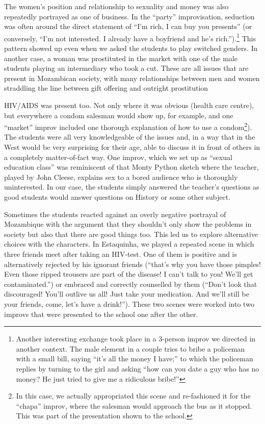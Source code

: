 \documentclass[article,twocolumn,twoside]{memoir}
\begin{document}
The women's position and relationship to sexuality and money was also
repeatedly portrayed as one of business. In the ``party'' improvisation,
seduction was often around the direct statement of ``I'm rich, I can buy you
presents'' (or conversely, ``I'm not interested. I already have a boyfriend and
he's rich.'').\footnote{Another interesting exchange took place in a 3-person
improv we directed in another context. The male element in a couple tries to
bribe a policeman with a small bill, saying ``it's all the money I have;'' to
which the policeman replies by turning to the girl and asking ``how can you
date a guy who has no money? He just tried to give me a ridiculous bribe!''}
This pattern showed up even when we asked the students to play switched
genders. In another case, a woman was prostituted in the market with one of the
male students playing an intermediary who took a cut. These are all issues that
are present in Mozambican society, with many relationships between men and
women straddling the line between gift offering and outright prostitution

HIV/AIDS was present too. Not only where it was obvious (health care centre),
but everywhere a condom salesman would show up, for example, and one ``market''
improv included one thorough explanation of how to use a condom\footnote{In
this case, we actually appropriated this scene and re-fashioned it for the
``chapa'' improv, where the salesman would approach the bus as it stopped. This
was part of the presentation shown to the school.}). The students were all
very knowledgeable of the issues and, in a way that in the West would be very
surprising for their age, able to discuss it in front of others in a completely
matter-of-fact way. One improv, which we set up as ``sexual education class''
was reminiscent of that Monty Python sketch where the teacher, played by John
Cleese, explains sex to a bored audience who is thoroughly uninterested. In our
case, the students simply answered the teacher's questions as good students
would answer questions on History or some other subject.

Sometimes the students reacted against an overly negative portrayal of
Mozambique with the argument that they shouldn't only show the problems in
society but also that there are good things too. This led us to explore
alternative choices with the characters. In Estaquinha, we played a repeated
scene in which three friends meet after taking an HIV-test. One of them is
positive and is alternatively rejected by his ignorant friends (``that's why
you have those pimples! Even those ripped trousers are part of the disease! I
can't talk to you! We'll get contaminated.'') or embraced and correctly
counselled by them (``Don't look that discouraged! You'll outlive us all! Just
take your medication. And we'll still be your friends, come, let's have a
drink!''). These two scenes were worked into two improvs that were presented to
the school one after the other.
\end{document}
